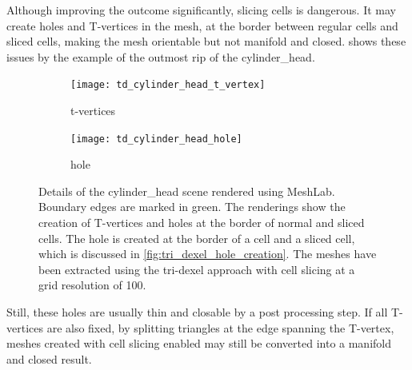Although improving the outcome significantly, slicing cells is dangerous.
It may create holes and T-vertices in the mesh, at the border between regular cells and sliced cells, making the mesh orientable but not manifold and closed.
 shows these issues by the example of the outmost rip of the cylinder\_head.
%
\begin{figure}
	\centering
	\begin{subfigure}[b]{0.49\textwidth}
		\centering
		\texttt{[image: td\_cylinder\_head\_t\_vertex]}
		\caption{t-vertices}
		\label{fig:td_cylinder_head_t_vertex}
	\end{subfigure}
	\begin{subfigure}[b]{0.49\textwidth}
		\centering
		\texttt{[image: td\_cylinder\_head\_hole]}
		\caption{hole}
		\label{fig:td_cylinder_head_hole}
	\end{subfigure}
	\caption{
		Details of the cylinder\_head scene rendered using MeshLab.
		Boundary edges are marked in green.
		The renderings show the creation of T-vertices and holes at the border of normal and sliced cells.
		The hole is created at the border of a cell and a sliced cell, which is discussed in \cref{fig:tri_dexel_hole_creation}.
		The meshes have been extracted using the tri-dexel approach with cell slicing at a grid resolution of 100.
	}
	\label{fig:td_cylinder_head_issues}
\end{figure}
%
Still, these holes are usually thin and closable by a post processing step.
If all T-vertices are also fixed, \eg by splitting triangles at the edge spanning the T-vertex, meshes created with cell slicing enabled may still be converted into a manifold and closed result.

